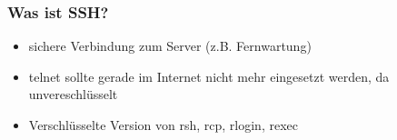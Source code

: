 \begin{frame}
\frametitle{Was ist SSH?}
\begin{itemize}
\item sichere Verbindung zum Server (z.B. Fernwartung)
\pause 
\item telnet sollte gerade im Internet nicht mehr eingesetzt werden, da unvereschlüsselt
\pause
\item Verschlüsselte Version von rsh, rcp, rlogin, rexec
\end{itemize}
\end{frame}